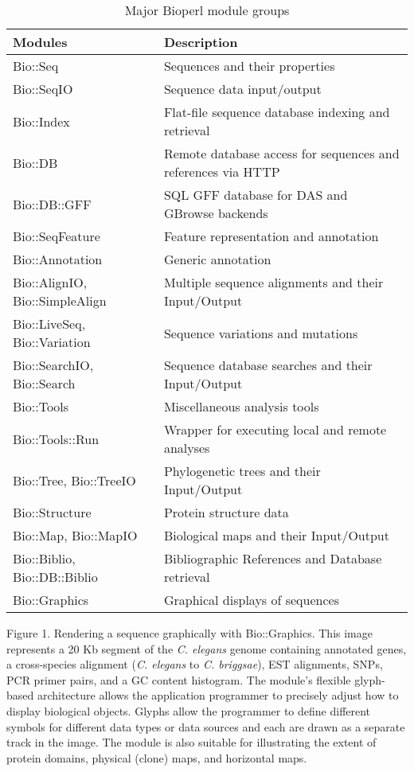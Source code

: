 \documentclass[12pt]{article}
\begin{document}
\newpage

\pagestyle{fancy}
\fancyhf{}
\renewcommand{\headrulewidth}{0pt}


\begin{table}[h]
\begin{tabular}{|l|l|}
\hline
\textbf{Modules} & \textbf{Description} \\
\hline
Bio::Seq &  Sequences and their properties \\
Bio::SeqIO & Sequence data input/output \\
Bio::Index & Flat-file sequence database indexing and retrieval \\ 
Bio::DB & Remote database access for sequences and references via HTTP \\
Bio::DB::GFF & SQL GFF database for DAS and GBrowse backends \\
Bio::SeqFeature & Feature representation and annotation \\
Bio::Annotation & Generic annotation \\
Bio::AlignIO, Bio::SimpleAlign   & Multiple sequence alignments and their Input/Output \\
Bio::LiveSeq, Bio::Variation & Sequence variations and mutations \\
Bio::SearchIO, Bio::Search  & Sequence database searches and their Input/Output \\
Bio::Tools &  Miscellaneous analysis tools \\
Bio::Tools::Run &  Wrapper for executing local and remote analyses \\
Bio::Tree, Bio::TreeIO & Phylogenetic trees and their Input/Output  \\
Bio::Structure & Protein structure data \\
Bio::Map, Bio::MapIO & Biological maps and their Input/Output \\
Bio::Biblio, Bio::DB::Biblio & Bibliographic References and Database
retrieval \\ 
Bio::Graphics & Graphical displays of sequences \\
\hline
\end{tabular}
\caption{Major Bioperl module groups}
\label{tab:modules}
\end{table}

\newpage


Figure 1.  Rendering a sequence graphically with Bio::Graphics.  This
image represents a 20 Kb segment of the \textit{C. elegans} genome
containing annotated genes, a cross-species alignment
(\textit{C. elegans} to \textit{C. briggsae}), EST alignments, SNPs,
PCR primer pairs, and a GC content histogram.  The module's flexible
glyph-based architecture allows the application programmer to
precisely adjust how to display biological objects.  Glyphs allow the
programmer to define different symbols for different data types or
data sources and each are drawn as a separate track in the image.  The
module is also suitable for illustrating the extent of protein
domains, physical (clone) maps, and horizontal maps.
\end{document}
